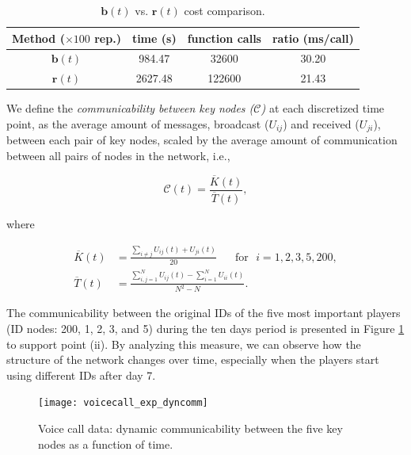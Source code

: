 \begin{table}[ht]
            \bigskip
		\centering %
		\begin{tabular}{c c c c} %
			\hline\hline %
			\textbf{Method ($\times 100$ rep.)} & \textbf{time (s)} & \textbf{function calls} & \textbf{ratio (ms/call)} \\ [0.1ex] %
			\hline\hline 
			$\mathbf{b}(t)$ & 984.47 & 32600 & 30.20 \\ %
			$\mathbf{r}(t)$ & 2627.48 & 122600 & 21.43 \\ [0.5ex] %
			\hline %
		\end{tabular}
		\caption{$\mathbf{b}(t)$ vs. $\mathbf{r}(t)$ cost comparison.} 
       \label{table:btrt} 
\end{table}

We define the \textit{communicability between key nodes ($\mathcal{C}$)} at each discretized time point, as the average amount of messages, broadcast ($U_{ij}$) and received ($U_{ji}$), between each pair of key nodes, scaled by the average amount of communication between all pairs of nodes in the network, i.e.,

\begin{equation*}
    \mathcal{C}(t) = \frac{\overline{K}(t)}{\overline{T}(t)},
\end{equation*}

where

\begin{align*}
    \overline{K}(t) &=\frac{\sum_{i\ne j}U_{ij}(t) + U_{ji}(t)}{20} \text{~~~~~for~~} i=1,2,3,5,200 ,\\
    \overline{T}(t) &=\frac{\sum_{i,j=1}^N U_{ij}(t) - \sum_{i=1}^N U_{ii}(t)}{N^2-N}.
\end{align*}

The communicability between the original IDs of the five most important players (ID nodes: 200, 1, 2, 3, and 5) during the ten days period is presented in Figure \ref{fig:ve2} to support point (ii). By analyzing this measure, we can observe how the structure of the network changes over time, especially when the players start using different IDs after day 7.

\begin{figure}[h]\centering
    \texttt{[image: voicecall\_exp\_dyncomm]}
    \caption{Voice call data: dynamic communicability between the five key nodes as a function of time.}
    \label{fig:ve2}
    \bigskip
\end{figure}